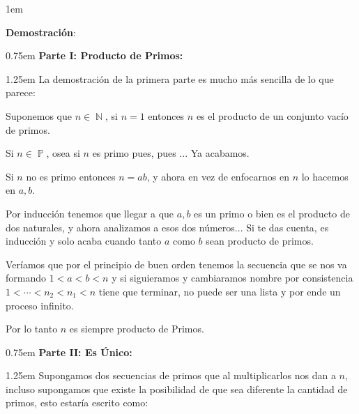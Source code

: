 \documentclass[12pt]{report}                                    %
\newenvironment{Indentation}[1][0.75em]                         %
    {\begin{adjustwidth}{#1}{}}                                     %
    {\end{adjustwidth}}                                             %
\newenvironment{SmallIndentation}[1][0.75em]                    %
    {\begin{adjustwidth}{#1}{}\begin{footnotesize}}                 %
    {\end{footnotesize}\end{adjustwidth}}                           %
\DeclareMathOperator \Naturals  {\mathbb{N}}                     %
\DeclareMathOperator \Primes    {\mathbb{P}}                     %
\begin{document}
        \begin{SmallIndentation}[1em]
            \textbf{Demostración}:\\


            \begin{Indentation}[0.75em]
                \textbf{Parte I: Producto de Primos:}
            \end{Indentation}

            \begin{Indentation}[1.25em]
                La demostración de la primera parte es mucho más sencilla
                de lo que parece:

                Suponemos que $n \in \Naturals$, si $n=1$ entonces $n$ es el
                producto de un conjunto vacío de primos.

                Si $n \in \Primes$, osea si $n$ es primo pues, pues ... Ya acabamos.

                Si $n$ no es primo entonces $n=ab$, y ahora en vez de enfocarnos en 
                $n$ lo hacemos en $a,b$.

                Por inducción tenemos que llegar a que $a,b$ es un primo o bien
                es el producto de dos naturales, y ahora analizamos a esos dos números...
                Si te das cuenta, es inducción y solo acaba cuando tanto $a$ como $b$ sean
                producto de primos.

                Veríamos que por el principio de buen orden tenemos la secuencia que se
                nos va formando $1 < a < b < n$ y si siguieramos y cambiaramos nombre
                por consistencia $1 <\cdots<n_2<n_1<n$ tiene que terminar, no puede ser
                una lista y por ende un proceso infinito.

                Por lo tanto $n$ es siempre producto de Primos.
            \end{Indentation}

            \begin{Indentation}[0.75em]
                \textbf{Parte II: Es Único:}
            \end{Indentation}

            \begin{Indentation}[1.25em]
                Supongamos dos secuencias de primos que al multiplicarlos nos dan
                a $n$, incluso supongamos que existe la posibilidad de que sea
                diferente la cantidad de primos, esto estaría escrito como:


\end{Indentation}
\end{SmallIndentation}
\end{document}
